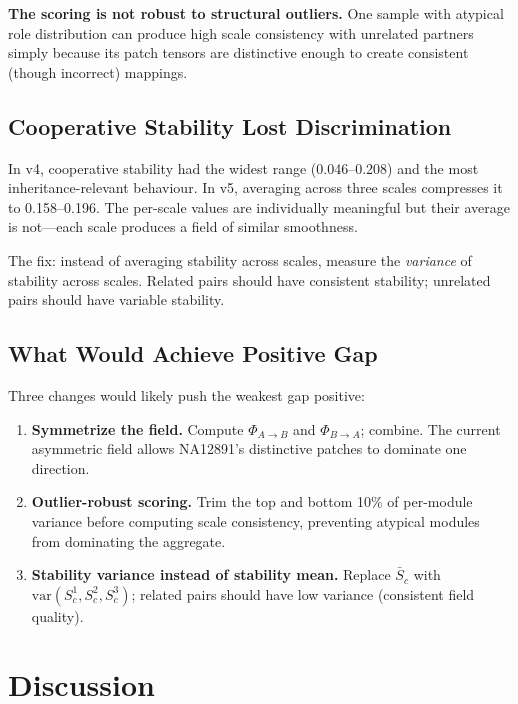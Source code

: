 \documentclass{../yalumba}
\begin{document}
\begin{limitation}
\textbf{The scoring is not robust to structural outliers.}  One sample with
atypical role distribution can produce high scale consistency with unrelated
partners simply because its patch tensors are distinctive enough to create
consistent (though incorrect) mappings.
\end{limitation}

\subsection{Cooperative Stability Lost Discrimination}

In v4, cooperative stability had the widest range (0.046--0.208) and
the most inheritance-relevant behaviour.  In v5, averaging across three
scales compresses it to 0.158--0.196.  The per-scale values are individually
meaningful but their average is not---each scale produces a field of
similar smoothness.

The fix: instead of averaging stability across scales, measure the
\emph{variance} of stability across scales.  Related pairs should have
consistent stability; unrelated pairs should have variable stability.

\subsection{What Would Achieve Positive Gap}

Three changes would likely push the weakest gap positive:

\begin{enumerate}
  \item \textbf{Symmetrize the field.}  Compute $\Phi_{A \to B}$ and
    $\Phi_{B \to A}$; combine.  The current asymmetric field allows
    NA12891's distinctive patches to dominate one direction.
  \item \textbf{Outlier-robust scoring.}  Trim the top and bottom 10\% of
    per-module variance before computing scale consistency, preventing
    atypical modules from dominating the aggregate.
  \item \textbf{Stability variance instead of stability mean.}  Replace
    $\bar{S}_c$ with $\text{var}(S_c^1, S_c^2, S_c^3)$; related pairs
    should have low variance (consistent field quality).
\end{enumerate}


\section{Discussion}
\label{sec:discussion}
\end{document}
